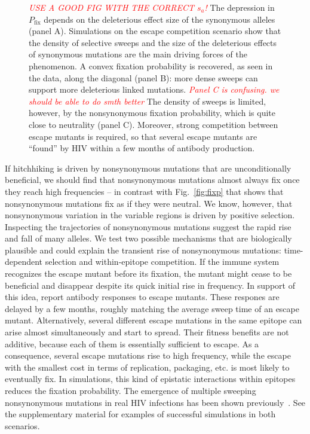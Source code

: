 \documentclass[rmp, twocolumn]{revtex4}
\newcommand{\comment}[1]{\textit{\textcolor{red}{#1}}}
\newcommand{\FIG}[1]{Fig.~\ref{fig:#1}}
\begin{document}
\begin{figure}
\begin{center}
{\label{fig:simheat2}}
\caption{\comment{USE A GOOD FIG WITH THE CORRECT $s_a$!} The depression in $P_\text{fix}$ depends on the deleterious effect size
 of the synonymous alleles (panel A). Simulations on the escape competition
 scenario show that the density of selective sweeps and the size of the
 deleterious effects of synonymous mutations are the main driving forces of the
 phenomenon. A convex fixation probability is recovered, as seen in the data,
 along the diagonal (panel B): more dense sweeps can support more deleterious
 linked mutations. 
 \comment{Panel C is confusing. we should be able to do smth better} The density
 of sweeps is limited, however, by the nonsynonymous fixation probability, which is quite close to neutrality (panel
 C). Moreover, strong competition between escape mutants is required, so that
 several escape mutants are ``found'' by HIV within a few months of antibody
production.}
\label{fig:simheat}
\end{center}
\end{figure}

If hitchhiking is driven by nonsynonymous mutations that are
unconditionally beneficial, we should find that nonsynonymous mutations almost
always fix once they reach high frequencies -- in contrast with \FIG{fixp} that
shows that nonsynonymous mutations fix as if they were neutral. We know,
however, that nonsynonymous variation in the variable regions is driven by
positive selection. Inspecting the trajectories of nonsynonymous mutations
suggest the rapid rise and fall of many alleles.  We test two possible
mechanisms that are biologically plausible and could explain the transient rise
of nonsynonymous mutations: time-dependent selection and within-epitope
competition. If the immune system recognizes the escape mutant before its
fixation, the mutant might cease to be beneficial and disappear despite its
quick initial rise in frequency.  In support of this idea,
\citet{richman_rapid_2003, bunnik_autologous_2008} report antibody responses to
escape mutants. These respones are delayed by a few months, roughly matching the
average sweep time of an escape mutant. Alternatively, several different escape
mutations in the same epitope can arise almost simultaneously and start to
spread. Their fitness benefits are not additive, because each of them is
essentially sufficient to escape. As a consequence, several escape mutations rise to
high frequency, while the escape with the smallest cost in terms of replication,
packaging, etc. is most likely to
eventually fix. In simulations, this kind of epistatic interactions within
epitopes reduces the fixation probability. The emergence of
multiple sweeping nonsynonymous mutations in real HIV infections has been shown
previously~\citep{moore_limited_2009, bar_early_2012}.
See the supplementary material for examples of successful simulations in both scenarios.
\end{document}
